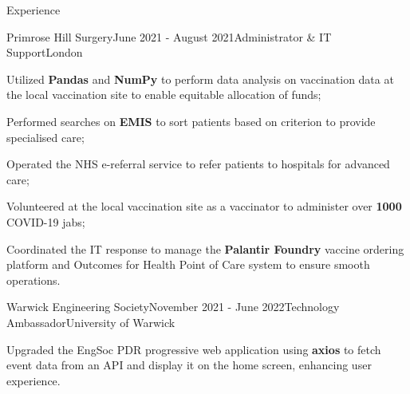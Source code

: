 \documentclass{resume}
\begin{document}
\begin{rSection}{Experience}
        \begin{rSubsection}{Primrose Hill Surgery}{June 2021 - August 2021}{Administrator \& IT Support}{London}{}
            \item Utilized \textbf{Pandas} and \textbf{NumPy} to perform data analysis on vaccination data at the local vaccination site to enable equitable allocation of funds;
            \item Performed searches on \textbf{EMIS} to sort patients based on criterion to provide specialised care;
            \item Operated the NHS e-referral service to refer patients to hospitals for advanced care;
            \item Volunteered at the local vaccination site as a vaccinator to administer over \textbf{1000} COVID-19 jabs;
            \item Coordinated the IT response to manage the \textbf{Palantir Foundry} vaccine ordering platform and Outcomes for Health Point of Care system to ensure smooth operations.
        \end{rSubsection}

        \begin{rSubsection}{Warwick Engineering Society}{November 2021 - June 2022}{Technology Ambassador}{University of Warwick}{}
            \item Upgraded the EngSoc PDR progressive web application using {\bf axios} to fetch event data from an API and display it on the home screen, enhancing user experience.
        \end{rSubsection}
    \end{rSection}
\end{document}
